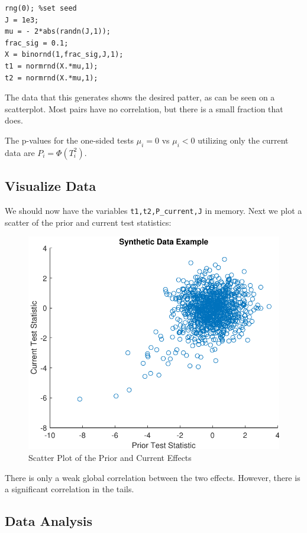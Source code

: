 \documentclass[english,11pt]{article} %
\begin{document}
\begin{verbatim}
rng(0); %set seed
J = 1e3;
mu = - 2*abs(randn(J,1));
frac_sig = 0.1;
X = binornd(1,frac_sig,J,1);
t1 = normrnd(X.*mu,1);
t2 = normrnd(X.*mu,1);
\end{verbatim}

The data that this generates shows the desired patter, as can be seen on a scatterplot. Most pairs have no correlation, but there is a small fraction that does.

The p-values for the one-sided tests $\mu_i = 0 $ vs $\mu_i <0$ utilizing only the current data are $P_i = \Phi(T^{2}_i)$.


\subsection{Visualize Data}

We should now have the variables \verb+t1,t2,P_current,J+ in memory. Next we plot a scatter of the prior and current test statistics:

\begin{figure}[ht!]
\centering
\includegraphics[scale=0.6]{"../Data/Synthetic_Data_example"}
\caption{Scatter Plot of the Prior and Current Effects}
\label{scatter_prior_current}
\end{figure}

There is only a weak global correlation between the two effects. However, there is a significant correlation in the tails. 


\subsection{Data Analysis}
\end{document}
